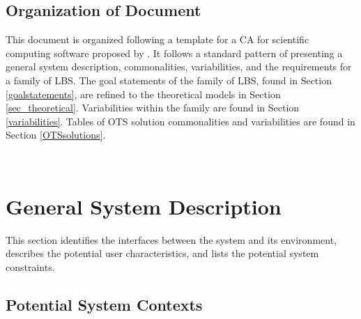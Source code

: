 \documentclass[12pt]{article}
\begin{document}
\subsection{Organization of Document}

This document is organized following a template for a CA for scientific computing software proposed by \citet{smith2006systematic}. It follows a standard pattern of presenting a general system description, commonalities, variabilities, and the requirements for a family of LBS. The goal statements of the family of LBS, found in Section \ref{goalstatements}, are refined to the theoretical models in Section \ref{sec_theoretical}. Variabilities within the family are found in Section \ref{variabilities}. Tables of OTS solution commonalities and variabilities are found in Section \ref{OTSsolutions}.

~\newpage

\section{General System Description}

This section identifies the interfaces between the system and its environment,
describes the potential user characteristics, and lists the potential system
constraints.

\subsection{Potential System Contexts}
\end{document}
